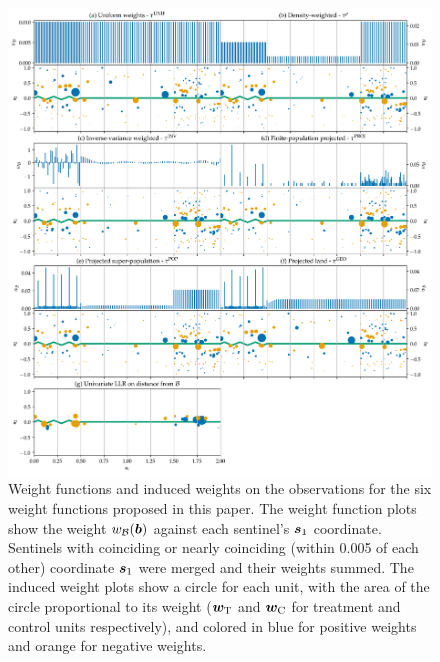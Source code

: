 \documentclass[letter,12pt]{article}
\begin{document}
\begin{figure}[ptb]
\centering
\includegraphics[width=\textwidth]{../figures/weight_functions.png}
\caption{\label{fig:weight_functions}Weight functions and induced weights on the observations for the six weight functions proposed in this paper. The weight function plots show the weight \(w_{\mathcal{B}}(\bm{b})\) against each sentinel's \(\bm{s}_1\) coordinate. Sentinels with coinciding or nearly coinciding (within 0.005 of each other) coordinate \(\bm{s}_1\) were merged and their weights summed. The induced weight plots show a circle for each unit, with the area of the circle proportional to its weight (\(\bm{w}_{\mathrm{T}}\) and \(\bm{w}_{\mathrm{C}}\) for treatment and control units respectively), and colored in blue for positive weights and orange for negative weights.}
\end{figure}
    
\end{document}
